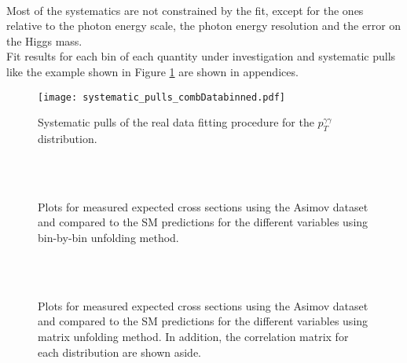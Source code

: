 \\Most of the systematics are not constrained by the fit, except for the ones relative to the photon energy scale, the photon energy resolution and the error on the Higgs mass.
\\Fit results for each bin of each quantity under investigation and systematic pulls like the example shown in Figure \ref{pull_example} are shown in appendices.
\newpage
\phantom{i}
\vspace{3cm}
\begin{figure}[h]
\centering
\texttt{[image: systematic\_pulls\_combDatabinned.pdf]}
\caption{Systematic pulls of the real data fitting procedure for the $p_T^{\gamma\gamma}$ distribution.}
\label{pull_example}
\end{figure}
\newpage
\begin{figure}[H]
\centering
{} \qquad
{} \\
 \qquad
{} \\
 \qquad
{}
\caption{Plots for measured expected cross sections using the Asimov dataset and compared to the SM predictions for the different variables using bin-by-bin unfolding method.}
\end{figure}
\begin{figure}[H]
\centering
{} \quad
{} \\
 \quad
{} \\
 \quad
{}
\caption{Plots for measured expected cross sections using the Asimov dataset and compared to the SM predictions for the different variables using matrix unfolding method. In addition, the correlation matrix for each distribution are shown aside.}
\end{figure}
